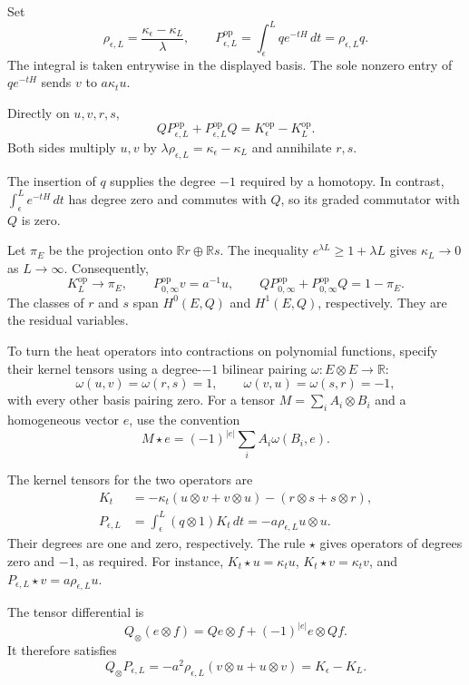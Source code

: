 Set
\[
 \rho_{\epsilon,L}
 =\frac{\kappa_\epsilon-\kappa_L}{\lambda},
 \qquad
 P_{\epsilon,L}^{\mathrm{op}}
 =\int_\epsilon^L q e^{-tH}\,dt
 =\rho_{\epsilon,L}q.
\]
The integral is taken entrywise in the displayed basis.
The sole nonzero entry of $qe^{-tH}$ sends $v$ to $a\kappa_tu$.

Directly on $u,v,r,s$,
\begin{equation}\label{eq:gaussian-heat-homotopy}
 QP_{\epsilon,L}^{\mathrm{op}}+P_{\epsilon,L}^{\mathrm{op}}Q
 =K_\epsilon^{\mathrm{op}}-K_L^{\mathrm{op}}.
\end{equation}
Both sides multiply $u,v$ by
$\lambda\rho_{\epsilon,L}=\kappa_\epsilon-\kappa_L$ and annihilate $r,s$.

The insertion of $q$ supplies the degree $-1$ required by a homotopy.
In contrast, $\int_\epsilon^L e^{-tH}\,dt$ has degree zero and
commutes with $Q$, so its graded commutator with $Q$ is zero.

Let $\pi_E$ be the projection onto $\mathbb R r\oplus\mathbb R s$.
The inequality $e^{\lambda L}\geq1+\lambda L$ gives
$\kappa_L\to0$ as $L\to\infty$.
Consequently,
\[
 K_L^{\mathrm{op}}\longrightarrow\pi_E,
 \qquad
 P_{0,\infty}^{\mathrm{op}}v=a^{-1}u,
 \qquad
 QP_{0,\infty}^{\mathrm{op}}+P_{0,\infty}^{\mathrm{op}}Q=1-\pi_E.
\]
The classes of $r$ and $s$ span $H^0(E,Q)$ and $H^1(E,Q)$,
respectively. They are the residual variables.

To turn the heat operators into contractions on polynomial functions,
specify their kernel tensors using a degree-$-1$ bilinear pairing
$\omega:E\otimes E\to\mathbb R$:
\[
 \omega(u,v)=\omega(r,s)=1,
 \qquad \omega(v,u)=\omega(s,r)=-1,
\]
with every other basis pairing zero.
For a tensor $M=\sum_i A_i\otimes B_i$ and a homogeneous vector $e$,
use the convention
\[
 M\star e=(-1)^{|e|}\sum_i A_i\omega(B_i,e).
\]

The kernel tensors for the two operators are
\[
 \begin{split}
 K_t&=-\kappa_t(u\otimes v+v\otimes u)
             -(r\otimes s+s\otimes r),\\
 P_{\epsilon,L}&=\int_\epsilon^L(q\otimes1)K_t\,dt
             =-a\rho_{\epsilon,L}u\otimes u.
 \end{split}
\]
Their degrees are one and zero, respectively.
The rule $\star$ gives operators of degrees zero and $-1$, as required.
For instance, $K_t\star u=\kappa_tu$,
$K_t\star v=\kappa_tv$, and
$P_{\epsilon,L}\star v=a\rho_{\epsilon,L}u$.

The tensor differential is
\[
 Q_{\otimes}(e\otimes f)=Qe\otimes f+(-1)^{|e|}e\otimes Qf.
\]
It therefore satisfies
\[
 Q_{\otimes}P_{\epsilon,L}
 =-a^2\rho_{\epsilon,L}(v\otimes u+u\otimes v)
 =K_\epsilon-K_L.
\]


